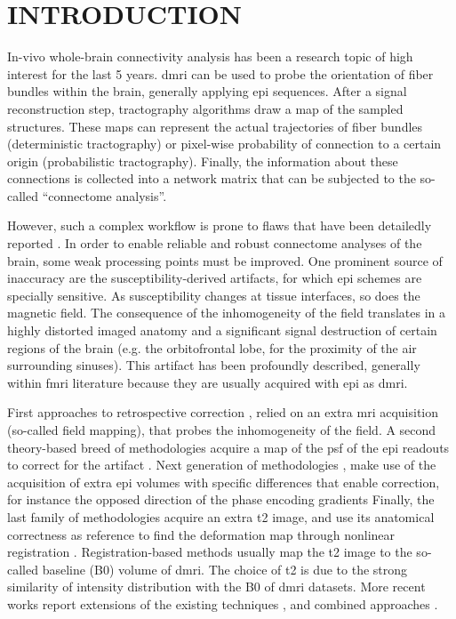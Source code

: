 \section{INTRODUCTION}

In-vivo whole-brain connectivity analysis has been a
research topic of high interest for the last
5 years. 
\Gls*{dmri} can be used to probe the
orientation of fiber bundles within the brain,
generally applying \gls*{epi} sequences.
After a signal reconstruction step, 
tractography algorithms draw a map of the sampled 
structures.
These maps can represent the actual trajectories
of fiber bundles (deterministic tractography) or
pixel-wise probability of connection to a certain origin
(probabilistic tractography). Finally, the
information about these connections is collected
into a network matrix that can be subjected to
the so-called ``connectome analysis''.

However, such a complex workflow is prone to
flaws that have been detailedly reported 
\cite{jones_twenty-five_2010}.
In order to enable reliable and robust connectome
analyses of the brain, some weak processing points must
be improved. One prominent source
of inaccuracy are the susceptibility-derived artifacts,
for which \Gls*{epi} schemes are specially sensitive.
As susceptibility changes at tissue interfaces,
so does the magnetic field. The consequence of the 
inhomogeneity of the field translates in a highly 
distorted imaged anatomy and a significant signal 
destruction of certain regions of the brain 
(e.g. the orbitofrontal lobe, for the proximity of the
air surrounding sinuses). This artifact has been
profoundly described, generally within \gls*{fmri}
literature because they are usually acquired with 
\gls*{epi} as \gls*{dmri}. 

First approaches to
retrospective correction \cite{jezzard_correction_1995},
relied on an extra \gls*{mri} acquisition (so-called
field mapping), that probes the inhomogeneity of the field.
A second theory-based breed of methodologies acquire a 
map of the \gls*{psf} of the \gls*{epi} readouts to correct 
for the artifact \cite{robson_measurement_1997}. 
Next generation of methodologies \cite{cordes_geometric_2000,
chiou_simple_2000}, make use of the acquisition of 
extra \gls*{epi} volumes 
with specific differences that enable correction, for instance
the opposed direction of the phase encoding gradients 
Finally, the last family of methodologies acquire an 
extra \gls*{t2} image, and use its anatomical correctness 
as reference to find the deformation map through nonlinear 
registration \cite{kybic_unwarping_2000,studholme_accurate_2000}.
Registration-based methods usually map
the \gls*{t2} image to the so-called baseline (B0) volume 
of \gls*{dmri}. The choice of \gls*{t2} is due to the strong
similarity of intensity distribution with the B0 of \gls*{dmri}
datasets. More recent works report extensions of the existing
techniques \cite{andersson_how_2003,holland_efficient_2010,
andersson_comprehensive_2012}, and combined approaches
\cite{zaitsev_point_2004}.

